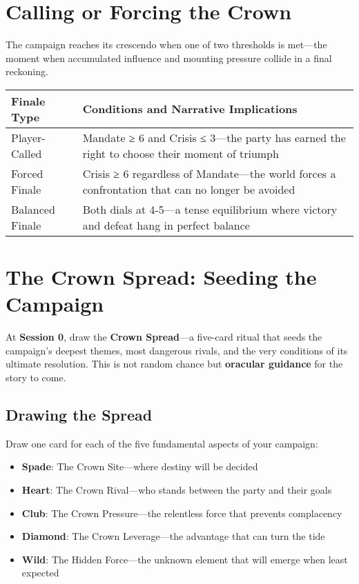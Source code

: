 \section*{Calling or Forcing the Crown}

The campaign reaches its crescendo when one of two thresholds is met—the moment when accumulated influence and mounting pressure collide in a final reckoning.

\begin{fatebox}
\begin{tabularx}{\textwidth}{lX}
\toprule
\textbf{Finale Type} & \textbf{Conditions and Narrative Implications} \\
\midrule
Player-Called & Mandate ≥ 6 and Crisis ≤ 3—the party has earned the right to choose their moment of triumph \\
Forced Finale & Crisis ≥ 6 regardless of Mandate—the world forces a confrontation that can no longer be avoided \\
Balanced Finale & Both dials at 4-5—a tense equilibrium where victory and defeat hang in perfect balance \\
\bottomrule
\end{tabularx}
\end{fatebox}

\section*{The Crown Spread: Seeding the Campaign}

At \textbf{Session 0}, draw the \textbf{Crown Spread}—a five-card ritual that seeds the campaign's deepest themes, most dangerous rivals, and the very conditions of its ultimate resolution. This is not random chance but \textbf{oracular guidance} for the story to come.

\subsection*{Drawing the Spread}

Draw one card for each of the five fundamental aspects of your campaign:

\begin{itemize}
    \item \textbf{Spade}: The Crown Site—where destiny will be decided
    \item \textbf{Heart}: The Crown Rival—who stands between the party and their goals
    \item \textbf{Club}: The Crown Pressure—the relentless force that prevents complacency
    \item \textbf{Diamond}: The Crown Leverage—the advantage that can turn the tide
    \item \textbf{Wild}: The Hidden Force—the unknown element that will emerge when least expected
\end{itemize}

